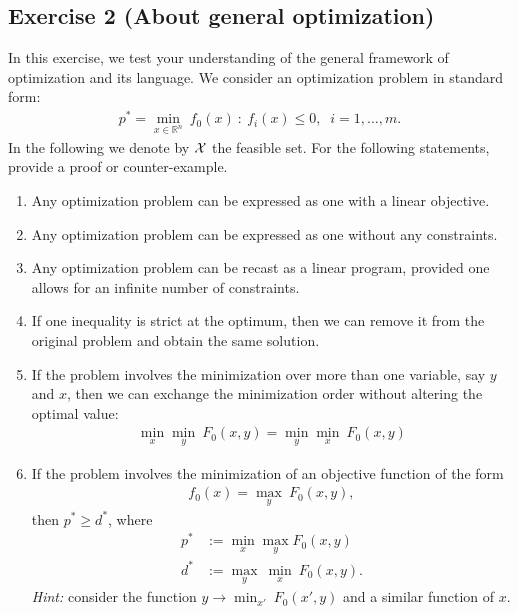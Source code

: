 \documentclass[11pt]{article}
\begin{document}
\newpage
\subsection*{Exercise 2 (About general optimization)}

In this exercise, we test your understanding of the general framework of optimization and its language. We consider an optimization problem in standard form:
\begin{align*}
    p^* = \min_{x \in \mathbb{R}^n} \: f_0(x) ~:~ f_i(x) \le 0, \;\; i=1,\ldots,m.
\end{align*}
In the following we denote by ${\cal X}$ the feasible set. For the following statements, provide a proof or counter-example.

\begin{enumerate}
    \item Any optimization problem can be expressed as one with a linear objective.

    \item Any optimization problem can be expressed as one without any constraints.

    \item Any optimization problem can be recast as a linear program, provided one allows for an infinite number of constraints.

    \item If one inequality is strict at the optimum, then we can remove it from the original problem and obtain the same solution.

    \item If the problem involves the minimization over more than one variable, say $y$ and $x$, then we can exchange the minimization order without altering the optimal value:
    \begin{align*}
    \min_x\min_y \: F_0(x,y) = \min_y\min_x \: F_0(x,y)
    \end{align*}

    \item If the problem involves the minimization of an objective function of the form
    \begin{align*}
    f_0(x) = \max_y \: F_0(x,y),
    \end{align*}
    then $p^* \ge d^*$, where
    \begin{align*}
    p^* &:= \min_{x} \max_y F_0(x, y) \\
    d^* &:= \max_y \: \min_{x} \: F_0(x,y).
    \end{align*}
    {\em Hint:} consider the function $y \rightarrow \min_{x'} \: F_0(x',y)$ and a similar function of $x$.
\end{enumerate}
\end{document}
